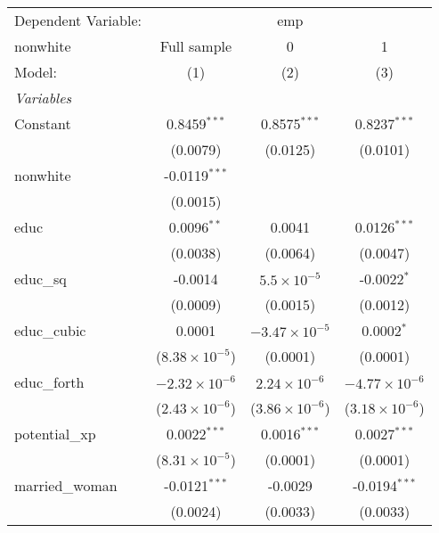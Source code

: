 \begingroup
\centering
\begin{tabular}{lccc}
   \tabularnewline \midrule \midrule
   Dependent Variable: & \multicolumn{3}{c}{emp}\\
   nonwhite        & Full sample             & 0                       & 1 \\   
   Model:          & (1)                     & (2)                     & (3)\\  
   \midrule
   \emph{Variables}\\
   Constant        & 0.8459$^{***}$          & 0.8575$^{***}$          & 0.8237$^{***}$\\   
                   & (0.0079)                & (0.0125)                & (0.0101)\\   
   nonwhite        & -0.0119$^{***}$         &                         &   \\   
                   & (0.0015)                &                         &   \\   
   educ            & 0.0096$^{**}$           & 0.0041                  & 0.0126$^{***}$\\   
                   & (0.0038)                & (0.0064)                & (0.0047)\\   
   educ\_sq        & -0.0014                 & $5.5\times 10^{-5}$     & -0.0022$^{*}$\\   
                   & (0.0009)                & (0.0015)                & (0.0012)\\   
   educ\_cubic     & 0.0001                  & $-3.47\times 10^{-5}$   & 0.0002$^{*}$\\   
                   & ($8.38\times 10^{-5}$)  & (0.0001)                & (0.0001)\\   
   educ\_forth     & $-2.32\times 10^{-6}$   & $2.24\times 10^{-6}$    & $-4.77\times 10^{-6}$\\    
                   & ($2.43\times 10^{-6}$)  & ($3.86\times 10^{-6}$)  & ($3.18\times 10^{-6}$)\\    
   potential\_xp   & 0.0022$^{***}$          & 0.0016$^{***}$          & 0.0027$^{***}$\\   
                   & ($8.31\times 10^{-5}$)  & (0.0001)                & (0.0001)\\   
   married\_woman  & -0.0121$^{***}$         & -0.0029                 & -0.0194$^{***}$\\   
                   & (0.0024)                & (0.0033)                & (0.0033)\\   

\end{tabular}
